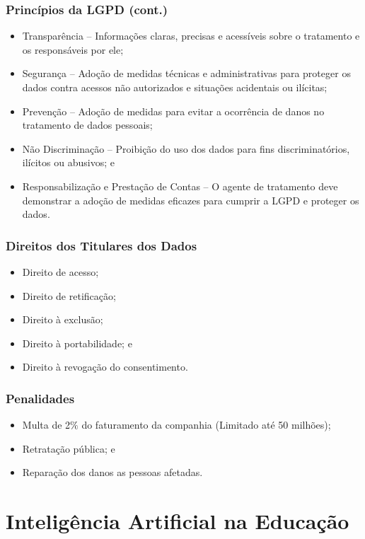 \documentclass[aspectratio=169]{beamer} %
\begin{document}
\begin{frame}
	\frametitle{Princípios da LGPD (cont.)}
	
	\begin{itemize}
		\item Transparência -- Informações claras, precisas e acessíveis sobre o tratamento e os responsáveis por ele;
		\item Segurança -- Adoção de medidas técnicas e administrativas para proteger os dados contra acessos não autorizados e situações acidentais ou ilícitas;
		\item Prevenção -- Adoção de medidas para evitar a ocorrência de danos no tratamento de dados pessoais;
		\item Não Discriminação -- Proibição do uso dos dados para fins discriminatórios, ilícitos ou abusivos; e
		\item Responsabilização e Prestação de Contas -- O agente de tratamento deve demonstrar a adoção de medidas eficazes para cumprir a LGPD e proteger os dados.
	\end{itemize}
\end{frame}

\begin{frame}
	\frametitle{Direitos dos Titulares dos Dados}
	
	\begin{itemize}
		\item Direito de acesso;
		\item Direito de retificação;
		\item Direito à exclusão;
		\item Direito à portabilidade; e
		\item Direito à revogação do consentimento.
	\end{itemize}
\end{frame}

\begin{frame}
	\frametitle{Penalidades}
	
	\begin{itemize}
		\item Multa de 2$\%$ do faturamento da companhia (Limitado até 50 milhões);
		\item Retratação pública; e
		\item Reparação dos danos as pessoas afetadas.
	\end{itemize}
\end{frame}

\section{Inteligência Artificial na Educação}
\end{document}
